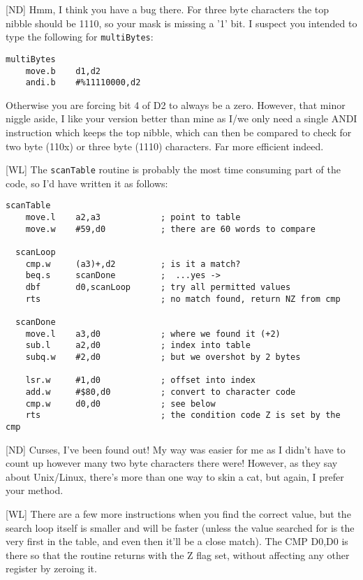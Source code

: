 [ND] Hmm, I think you have a bug there. For three byte characters the top nibble should be 1110, so your mask is missing a '1' bit. I suspect you intended to type the following for \texttt{multiBytes}:

\begin{lstlisting}[numbers=none]	
  multiBytes
    move.b    d1,d2
    andi.b    #%11110000,d2
\end{lstlisting}

Otherwise you are forcing bit 4 of D2 to always be a zero. However, that minor niggle aside, I like your version better than mine as I/we only need a single ANDI instruction which keeps the top nibble, which can then be compared to check for two byte (110x) or three byte (1110) characters. Far more efficient indeed.

	
[WL] The \texttt{scanTable} routine is probably the most time consuming part of the code, so I'd have written it as follows:

\begin{lstlisting}[numbers=none]	
  scanTable
    move.l    a2,a3            ; point to table
    move.w    #59,d0           ; there are 60 words to compare

  scanLoop
    cmp.w     (a3)+,d2         ; is it a match?
    beq.s     scanDone         ;  ...yes ->
    dbf       d0,scanLoop      ; try all permitted values
    rts                        ; no match found, return NZ from cmp

  scanDone   
    move.l    a3,d0            ; where we found it (+2)
    sub.l     a2,d0            ; index into table
    subq.w    #2,d0            ; but we overshot by 2 bytes

    lsr.w     #1,d0            ; offset into index
    add.w     #$80,d0          ; convert to character code
    cmp.w     d0,d0            ; see below
    rts                        ; the condition code Z is set by the cmp
\end{lstlisting}

[ND] Curses, I've been found out! My way was easier for me as I didn't have to count up however many two byte characters there were! However, as they say about Unix/Linux, there's more than one way to skin a cat, but again, I prefer your method.
	
[WL] There are a few more instructions when you find the correct value, but the search loop itself is smaller and will be faster (unless the value searched for is the very first in the table, and even then it'll be a close match). The CMP D0,D0 is there so that the routine returns with the Z flag set, without affecting any other register by zeroing it. 


